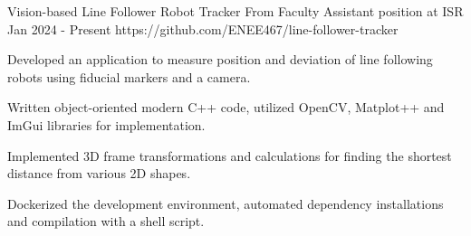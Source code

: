 \begin{project}
  {Vision-based Line Follower Robot Tracker}
  {From Faculty Assistant position at ISR}
  {Jan 2024 - Present}
  {https://github.com/ENEE467/line-follower-tracker}

  \item Developed an application to measure position and deviation of line following robots
        using fiducial markers and a camera.

  \item Written object-oriented modern C++ code, utilized OpenCV, Matplot++ and ImGui libraries for
        implementation.

  \item Implemented 3D frame transformations and calculations for finding the shortest distance from
        various 2D shapes.

  \item Dockerized the development environment, automated dependency installations and compilation
        with a shell script.

\end{project}
